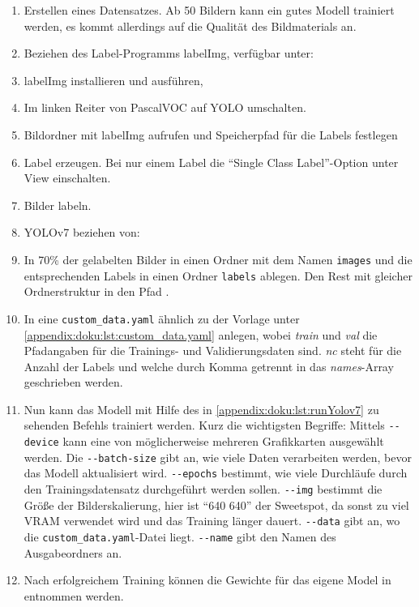 \begin{enumerate}[label={\arabic*.}]
  \item Erstellen eines Datensatzes. Ab 50 Bildern kann ein gutes Modell trainiert werden, es kommt allerdings auf die Qualität des Bildmaterials an.
  \item Beziehen des Label-Programms labelImg, verfügbar unter:


  \item labelImg installieren und ausführen,
  \item Im linken Reiter von PascalVOC auf YOLO umschalten.
  \item Bildordner mit labelImg aufrufen und Speicherpfad für die Labels festlegen
  \item Label erzeugen. Bei nur einem Label die \enquote{Single Class Label}-Option unter View einschalten.
  \item Bilder labeln.
  \item YOLOv7 beziehen von:


  \item In  70\% der gelabelten Bilder in einen Ordner mit dem Namen \texttt{images} und die entsprechenden Labels in einen Ordner \texttt{labels} ablegen. Den Rest mit gleicher Ordnerstruktur in den Pfad .
  \item In  eine \texttt{custom\_data.yaml} ähnlich zu der Vorlage unter \vref{appendix:doku:lst:custom_data.yaml} anlegen, wobei \textit{train} und \textit{val} die Pfadangaben für die Trainings- und Validierungsdaten sind. \textit{nc} steht für die Anzahl der Labels und welche durch Komma getrennt in das \textit{names}-Array geschrieben werden.
  \item Nun kann das Modell mit Hilfe des in \vref{appendix:doku:lst:runYolov7} zu sehenden Befehls trainiert werden. Kurz die wichtigsten Begriffe: Mittels \lstinline{--device} kann eine von möglicherweise mehreren Grafikkarten ausgewählt werden. Die \lstinline{--batch-size} gibt an, wie viele Daten verarbeiten werden, bevor das Modell aktualisiert wird. \lstinline{--epochs} bestimmt, wie viele Durchläufe durch den Trainingsdatensatz durchgeführt werden sollen. \lstinline{--img} bestimmt die Größe der Bilderskalierung, hier ist \enquote{640 640} der Sweetspot, da sonst zu viel VRAM verwendet wird und das Training länger dauert. \lstinline{--data} gibt an, wo die \texttt{custom\_data.yaml}-Datei liegt. \lstinline{--name} gibt den Namen des Ausgabeordners an.
  \item Nach erfolgreichem Training können die Gewichte für das eigene Model in  entnommen werden.
\end{enumerate}

